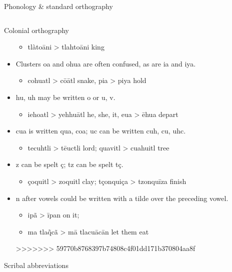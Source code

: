 \documentclass[12pt]{beamer}
\newcommand{\nah}[1]{\textcolor{nahgrn}{#1}}
\newcommand{\trs}[1]{\textcolor{nahblu}{#1}}
\begin{document}
\begin{frame}
\begin{columns}[t]
\begin{column}{.22\linewidth}
\begin{block}{Phonology \& standard orthography}
\begin{threeparttable}
\begin{tablenotes}
\begin{frame}
\begin{columns}[t]
\begin{column}{.23\linewidth}
\begin{block}{Colonial orthography}
\begin{itemize}
\begin{itemize}
                  \item \nah{tlàtoāni} > \nah{tlahtoāni} \trs{king}
                \end{itemize}
          \item Clusters \nah{oa} and \nah{ohua} are often confused, as are \nah{ia} and \nah{iya}.
                \begin{itemize}
                  \item \nah{cohuatl} > \nah{cōātl} \trs{snake}, \nah{pia} > \nah{piya} \trs{hold}
                \end{itemize}
          \item \nah{hu, uh} may be written \nah{o} or \nah{u, v}.
                \begin{itemize}
                  \item \nah{iehoatl} > \nah{yehhuātl} \trs{he, she, it}, \nah{eua} > \nah{ēhua} \trs{depart}
                \end{itemize}
          \item \nah{cua} is written \nah{qua, coa}; \nah{uc} can be written \nah{cuh, cu, uhc}.
                \begin{itemize}
                  \item \nah{tecuhtli} > \nah{tēuctli} \trs{lord}; \nah{quavitl} > \nah{cuahuitl} \trs{tree}
                \end{itemize}
          \item \nah{z} can be spelt \nah{ç}; \nah{tz} can be spelt \nah{tç}.
                \begin{itemize}
                  \item \nah{çoquitl} > \nah{zoquitl} \trs{clay}; \nah{tçonquiça} > \nah{tzonquīza} \trs{finish}
                \end{itemize}
          \item \nah{n} after vowels could be written with a tilde over the preceding vowel.
                \begin{itemize}
                  \item \nah{ipã} > \nah{īpan} \trs{on it};
                  \item \nah{ma tla\~qcã} > \nah{mā tlacuācān} \trs{let them eat}
                \end{itemize}
>>>>>>> 59770b8768397b74808c4f01dd171b370804aa8f
        \end{itemize}
      \end{block}
      \begin{block}{Scribal abbreviations}
        \vspace{-1.5ex}

\end{block}
\end{column}
\end{columns}
\end{frame}
\end{tablenotes}
\end{threeparttable}
\end{block}
\end{column}
\end{columns}
\end{frame}
\end{document}
